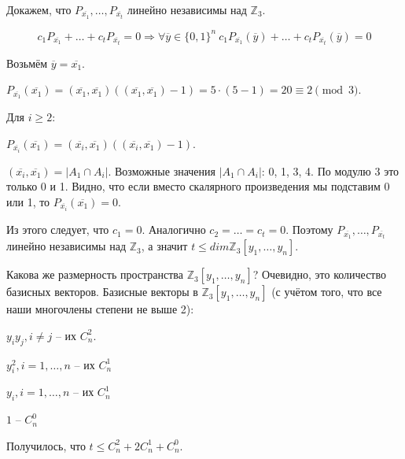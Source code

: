 Докажем, что $P_{\overline{x_1}}, \ldots, P_{\overline{x_t}}$ линейно независимы над $\mathbb{Z}_3$.

$$
c_1 P_{\overline{x_1}} + \ldots + c_t P_{\overline{x_t}} = 0
\Rightarrow
\forall \overline{y} \in \{ 0, 1 \}^n \ 
c_1 P_{\overline{x_1}}(\overline{y}) + \ldots + c_t P_{\overline{x_t}}(\overline{y}) = 0
$$

Возьмём $\overline{y} = \overline{x_1}$.

$P_{\overline{x_1}}(\overline{x_1}) = 
(\overline{x_1}, \overline{x_1})((\overline{x_1}, \overline{x_1}) - 1) = 
5 \cdot (5 - 1) = 20 \equiv 2 \pmod{3}$.

Для $i \geqslant 2$:

$P_{\overline{x_i}}(\overline{x_1}) = 
(\overline{x_i}, \overline{x_1})((\overline{x_i}, \overline{x_1}) - 1)$.

$(\overline{x_i}, \overline{x_1}) = |A_1 \cap A_i|$. 
Возможные значения $|A_1 \cap A_i|$: 0, 1, 3, 4. По модулю 3 это только 0 и 1.
Видно, что если вместо скалярного произведения мы подставим 0 или 1, то 
$P_{\overline{x_i}}(\overline{x_1}) = 0$.

Из этого следует, что $c_1 = 0$. Аналогично $c_2 = \ldots = c_t = 0$. 
Поэтому $P_{\overline{x_1}}, \ldots, P_{\overline{x_t}}$ линейно независимы над $\mathbb{Z}_3$, а значит $t \leqslant dim \mathbb{Z}_3 [y_1, \ldots, y_n]$.

Какова же размерность пространства $\mathbb{Z}_3 [y_1, \ldots, y_n]$? 
Очевидно, это количество базисных векторов. 
Базисные векторы в $\mathbb{Z}_3 [y_1, \ldots, y_n]$ 
(с учётом того, что все наши многочлены степени не выше 2):

$y_i y_j, i \neq j$ -- их $C_n^2$.

$y_i^2, i = 1, \ldots, n$ -- их $C_n^1$

$y_i, i = 1, \ldots, n$ -- их $C_n^1$

$1$ -- $C_n^0$

Получилось, что $t \leqslant C_n^2 + 2C_n^1 + C_n^0$.
